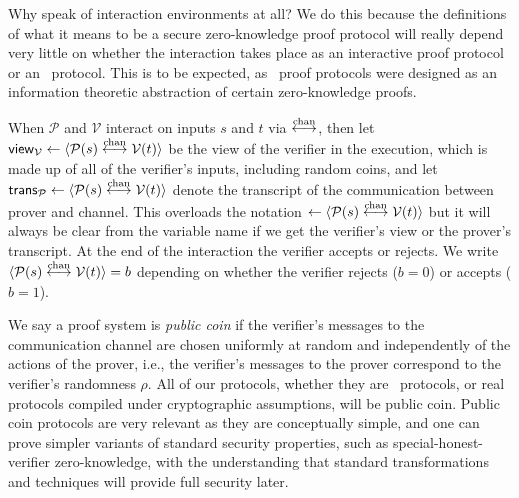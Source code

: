 Why speak of interaction environments at all? We do this because the definitions of what it means to be a secure zero-knowledge proof protocol will really depend very little on whether the interaction takes place as an interactive proof protocol or an \ILC\ protocol. This is to be expected, as \ILC\ proof protocols were designed as an information theoretic abstraction of certain zero-knowledge proofs.

When $\mathcal{P}$ and $\mathcal{V}$ interact on inputs $s$ and $t$ via $\overset{\textnormal{chan}}{\longleftrightarrow}$, then let $\mathsf{view}_{\mathcal{V}} \leftarrow \langle \mathcal{P}(s) \overset{\textnormal{chan}}{\longleftrightarrow} \mathcal{V}(t)\rangle$ be the view of the verifier in the execution, which is made up of all of the verifier's inputs, including random coins, and let $\mathsf{trans}_{\mathcal{P}} \leftarrow  \langle \mathcal{P}(s) \overset{\textnormal{chan}}{\longleftrightarrow} \mathcal{V}(t)\rangle$ denote the transcript of the communication between prover and channel. This overloads the notation $\leftarrow  \langle \mathcal{P}(s) \overset{\textnormal{chan}}{\longleftrightarrow} \mathcal{V}(t)\rangle$ but it will always be clear from the variable name if we get the verifier's view or the prover's transcript. At the end of the interaction the verifier accepts or rejects. We write $\langle \mathcal{P}(s)\overset{\textnormal{chan}}{\longleftrightarrow} \mathcal{V}(t)\rangle =b$ depending on whether the verifier rejects ($b=0$) or accepts ($b=1$).

We say a proof system is \emph{public coin} if the verifier's messages to the communication channel are chosen uniformly at random and independently of the actions of the prover, i.e., the verifier's messages to the prover correspond to the verifier's randomness $\rho$. All of our protocols, whether they are \ILC\ protocols, or real protocols compiled under cryptographic assumptions, will be public coin. Public coin protocols are very relevant as they are conceptually simple, and one can prove simpler variants of standard security properties, such as special-honest-verifier zero-knowledge, with the understanding that standard transformations and techniques will provide full security later.

